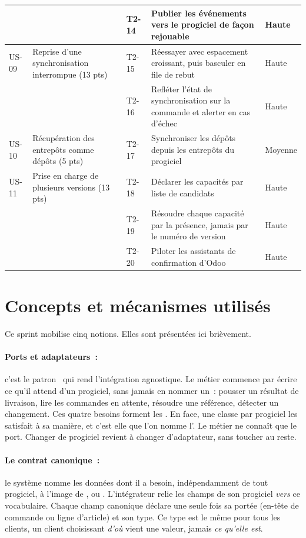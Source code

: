\begin{small}
\begin{longtable}{L{1.1cm}L{3.0cm}L{1.2cm}L{7.0cm}L{1.3cm}}
\hline
      &  & T2-14 & Publier les événements vers le progiciel de façon rejouable & Haute \\
\hline
US-09 & Reprise d'une synchronisation interrompue (13 pts) & T2-15 & Réessayer avec espacement croissant, puis basculer en file de rebut & Haute \\
\hline
      &  & T2-16 & Refléter l'état de synchronisation sur la commande et alerter en cas d'échec & Haute \\
\hline
US-10 & Récupération des entrepôts comme dépôts (5 pts) & T2-17 & Synchroniser les dépôts depuis les entrepôts du progiciel & Moyenne \\
\hline
US-11 & Prise en charge de plusieurs versions (13 pts) & T2-18 & Déclarer les capacités par liste de candidats & Haute \\
\hline
      &  & T2-19 & Résoudre chaque capacité par la présence, jamais par le numéro de version & Haute \\
\hline
      &  & T2-20 & Piloter les assistants de confirmation d'Odoo & Haute \\
\hline
\end{longtable}
\end{small}

\section{Concepts et mécanismes utilisés}

Ce sprint mobilise cinq notions. Elles sont présentées ici brièvement.

\paragraph{Ports et adaptateurs~:} c'est le patron~\cite{cockburn05} qui rend l'intégration agnostique. Le métier
commence par écrire ce qu'il attend d'un progiciel, sans jamais en nommer un~: pousser un résultat de
livraison, lire les commandes en attente, résoudre une référence, détecter un changement. Ces quatre
besoins forment les . En face, une classe par progiciel les satisfait à sa manière, et
c'est elle que l'on nomme l'. Le métier ne connaît que le port. Changer de progiciel revient à changer
d'adaptateur, sans toucher au reste.

\paragraph{Le contrat canonique~:} le système nomme les données dont il a besoin, indépendamment de
tout progiciel, à l'image de ,  ou . L'intégrateur
relie les champs de son progiciel \emph{vers} ce vocabulaire. Chaque champ canonique déclare une seule
fois sa portée (en-tête de commande ou ligne d'article) et son type. Ce type est le même pour tous les
clients, un client choisissant \emph{d'où} vient une valeur, jamais \emph{ce qu'elle est}.

